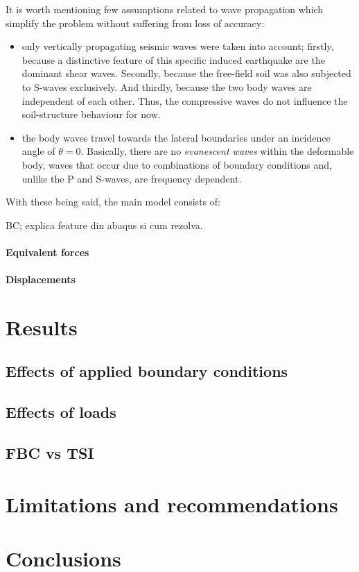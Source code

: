 	It is worth mentioning few assumptions related to wave propagation which simplify the problem without suffering from loss of accuracy:
	\begin{itemize}
		\item only vertically propagating seismic waves were taken into account; firstly, because a distinctive feature of this specific induced earthquake are the dominant shear waves. Secondly, because the free-field soil was also subjected to S-waves exclusively. And thirdly, because the two body waves are independent of each other. Thus, the compressive waves do not influence the soil-structure behaviour for now.
		\item the body waves travel towards the lateral boundaries under an incidence angle of $\theta = 0$. Basically, there are no \textit{evanescent waves} within the deformable body, waves that occur due to combinations of boundary conditions and, unlike the P and S-waves, are frequency dependent.
	\end{itemize}
	
	With these being said, the main model consists of:

	BC; explica feature din abaqus si cum rezolva.
	\paragraph{Equivalent forces}
	\paragraph{Displacements}
	 

\section{Results}
\subsection{Effects of applied boundary conditions}
\subsection{Effects of loads}
\subsection{FBC vs TSI}

\section{Limitations and recommendations}
\section{Conclusions}


